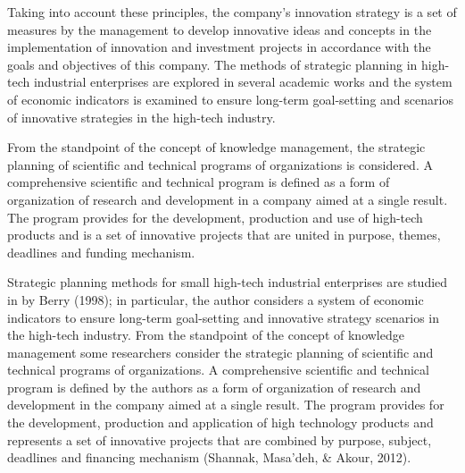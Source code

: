 \documentclass[12pt,twoside]{reedthesis}
\begin{document}
Taking into account these principles, the company's innovation strategy is a set of measures by the management to develop innovative ideas and concepts in the implementation of innovation and investment projects in accordance with the goals and objectives of this company. The methods of strategic planning in high-tech industrial enterprises are explored in several academic works and the system of economic indicators is examined to ensure long-term goal-setting and scenarios of innovative strategies in the high-tech industry.

From the standpoint of the concept of knowledge management, the strategic planning of scientific and technical programs of organizations is considered. A comprehensive scientific and technical program is defined as a form of organization of research and development in a company aimed at a single result. The program provides for the development, production and use of high-tech products and is a set of innovative projects that are united in purpose, themes, deadlines and funding mechanism.

Strategic planning methods for small high-tech industrial enterprises are studied in by Berry (1998); in particular, the author considers a system of economic indicators to ensure long-term goal-setting and innovative strategy scenarios in the high-tech industry. From the standpoint of the concept of knowledge management some researchers consider the strategic planning of scientific and technical programs of organizations. A comprehensive scientific and technical program is defined by the authors as a form of organization of research and development in the company aimed at a single result. The program provides for the development, production and application of high technology products and represents a set of innovative projects that are combined by purpose, subject, deadlines and financing mechanism (Shannak, Masa'deh, \& Akour, 2012).
\end{document}
